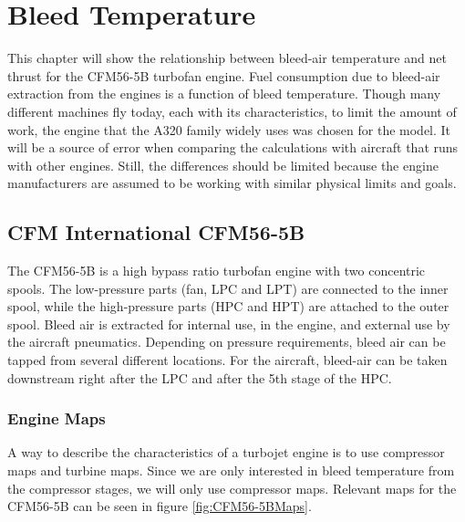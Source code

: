 \documentclass[english]{kththesis}
\begin{document}
\chapter{Bleed Temperature}
\label{ch:bleedtemp}
This chapter will show the relationship between bleed-air temperature and net thrust for the CFM56-5B turbofan engine. Fuel consumption due to bleed-air extraction from the engines is a function of bleed temperature. Though many different machines fly today, each with its characteristics, to limit the amount of work, the engine that the A320 family widely uses was chosen for the model. It will be a source of error when comparing the calculations with aircraft that runs with other engines. Still, the differences should be limited because the engine manufacturers are assumed to be working with similar physical limits and goals.

\section{CFM International CFM56-5B}
\label{sec:cfm56-5b}
The CFM56-5B is a high bypass ratio turbofan engine with two concentric spools. The low-pressure parts (fan, LPC and LPT) are connected to the inner spool, while the high-pressure parts (HPC and HPT) are attached to the outer spool. Bleed air is extracted for internal use, in the engine, and external use by the aircraft pneumatics. Depending on pressure requirements, bleed air can be tapped from several different locations. For the aircraft, bleed-air can be taken downstream right after the LPC and after the 5th stage of the HPC.

\subsection{Engine Maps}
\label{subsec:enginemaps}
A way to describe the characteristics of a turbojet engine is to use compressor maps and turbine maps. Since we are only interested in bleed temperature from the compressor stages, we will only use compressor maps. Relevant maps for the CFM56-5B can be seen in figure \ref{fig:CFM56-5BMaps}.
\end{document}
